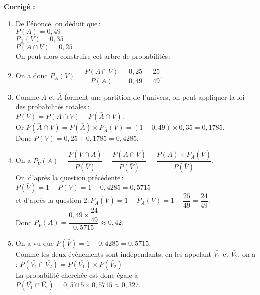 \documentclass[a4paper,11pt,exos]{nsi} %
\begin{document}
\textcolor{UGLiBlue}{
    \textbf{Corrigé :}
\begin{enumerate}
    \item De l'énoncé, on déduit que\,:\\ $P(A)=0{,}49$\\ $P_{\bar{A}}(V)=0{,}35$\\ $P(A \cap V)=0{,}25$\\On peut alors construire cet arbre de probabilités\,:
    \def\abun{$A$}
    \def\alun{0,49}
    \def\abdeux{$\barmaj{A}$}
    \def\aldeux{0,51}
    \def\abtrois{$V$}
    \def\altrois{}
    \def\abquatre{$\barmaj{V}$}
    \def\alquatre{}
    \def\abcinq{$V$}
    \def\alcinq{0,35}
    \def\absix{$\barmaj{V}$}
    \def\alsix{0,65}
    \begin{center}
        \arbreproba
    \end{center}
    \item On a donc $P_{A}(V)=\dfrac{P(A \cap V)}{P(A)}=\dfrac{0{,}25}{0{,}49}=\dfrac{25}{49}$.
    \item Comme $A$ et $\bar A$ forment une partition de l'univers, on peut appliquer la loi des probabilités totales\,: \\
    $P(V)=P(A \cap V)+P(\bar{A} \cap V). $\\
    Or $P(\bar{A} \cap V)=P(\bar{A}) \times P_{\bar{A}}(V)=(1-0{,}49) \times 0{,}35=0{,}1785$.\\
    Donc $P(V)=0{,}25+0{,}1785=0{,}4285$.
    \item On a $P_{\bar{V}}(A)=\dfrac{P(\bar{V} \cap A)}{P(\bar{V})}=\dfrac{P(A \cap \bar{V})}{P(\bar{V})}=\dfrac{P(A) \times P_A(\bar{V})}{P(\bar{V})}$.\\
    Or, d'après la question précédente\,:\,$P(\bar{V})=1-P(V)=1-0{,}4285=0{,}5715$\\
    et d'après la question $2: P_{A}(\bar{V})=1-P_{A}(V)=1-\dfrac{25}{49}=\dfrac{24}{49}$.\\Donc $P_{\bar{V}}(A)=\dfrac{0{,}49 \times \dfrac{24}{49}}{0{,}5715} \approx0{,}42$.
    \item On a vu que $P(\bar{V})=1-0{,}4285=0{,}5715$.\\Comme les deux événements sont indépendants, en les appelant $\bar {V_1}$ et $\bar{V_2}$, on a : $P(\bar{V_1}\cap\bar{V_2})=P(\bar{V_1})\times P(\bar{V_2})$\\La probabilité cherchée est donc égale à $P(\bar{V_1}\cap\bar{V_2})=0{,}5715 \times 0{,}5715\approx0{,}327$.
\end{enumerate}
}
\end{document}
